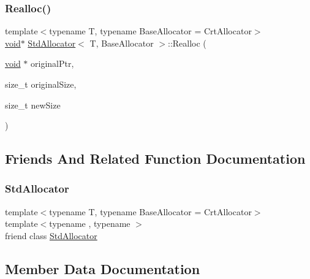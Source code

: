 \subsubsection{\texorpdfstring{Realloc()}{Realloc()}}
{\footnotesize\ttfamily template$<$typename T, typename Base\+Allocator = Crt\+Allocator$>$ \\
\hyperlink{imgui__impl__opengl3__loader_8h_ac668e7cffd9e2e9cfee428b9b2f34fa7}{void}$\ast$ \hyperlink{classStdAllocator}{Std\+Allocator}$<$ T, Base\+Allocator $>$\+::Realloc (\begin{DoxyParamCaption}\item[{\hyperlink{imgui__impl__opengl3__loader_8h_ac668e7cffd9e2e9cfee428b9b2f34fa7}{void} $\ast$}]{original\+Ptr,  }\item[{size\+\_\+t}]{original\+Size,  }\item[{size\+\_\+t}]{new\+Size }\end{DoxyParamCaption})\hspace{0.3cm}{\ttfamily [inline]}}



\subsection{Friends And Related Function Documentation}
\mbox{\label{classStdAllocator_afb3a6a655f835f6b9ec21fab41291287}} 
\subsubsection{\texorpdfstring{Std\+Allocator}{StdAllocator}}
{\footnotesize\ttfamily template$<$typename T, typename Base\+Allocator = Crt\+Allocator$>$ \\
template$<$typename , typename $>$ \\
friend class \hyperlink{classStdAllocator}{Std\+Allocator}\hspace{0.3cm}{\ttfamily [friend]}}



\subsection{Member Data Documentation}
\mbox{\label{classStdAllocator_a66c60fe437ac39440d37410884dd18be}} 
